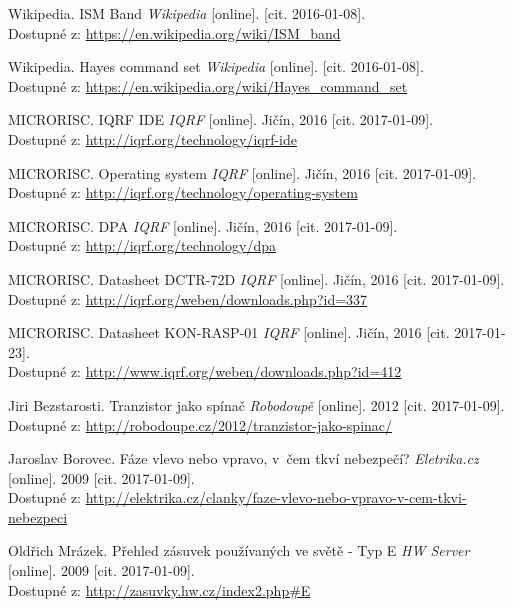 \documentclass[12pt,a4paper,oneside]{article}
\begin{document}
\begin{thebibliography}{99}


Wikipedia. ISM Band \emph{Wikipedia} [online]. [cit. 2016-01-08]. \\ Dostupné z: \url{https://en.wikipedia.org/wiki/ISM\_band}

Wikipedia. Hayes command set \emph{Wikipedia} [online]. [cit. 2016-01-08]. \\ Dostupné z: \url{https://en.wikipedia.org/wiki/Hayes\_command\_set}

MICRORISC. IQRF IDE \emph{IQRF} [online]. Jičín, 2016 [cit. 2017-01-09]. \\ Dostupné z: \url{http://iqrf.org/technology/iqrf-ide}

MICRORISC. Operating system \emph{IQRF} [online]. Jičín, 2016 [cit. 2017-01-09]. \\ Dostupné z: \url{http://iqrf.org/technology/operating-system}

MICRORISC. DPA \emph{IQRF} [online]. Jičín, 2016 [cit. 2017-01-09]. \\ Dostupné z: \url{http://iqrf.org/technology/dpa}

MICRORISC. Datasheet DCTR-72D \emph{IQRF} [online]. Jičín, 2016 [cit. 2017-01-09]. \\ Dostupné z: \url{http://iqrf.org/weben/downloads.php?id=337}

MICRORISC. Datasheet KON-RASP-01 \emph{IQRF} [online]. Jičín, 2016 [cit. 2017-01-23]. \\ Dostupné z: \url{http://www.iqrf.org/weben/downloads.php?id=412}

Jiri Bezstarosti. Tranzistor jako spínač \emph{Robodoupě} [online]. 2012 [cit. 2017-01-09]. \\ Dostupné z: \url{http://robodoupe.cz/2012/tranzistor-jako-spinac/}

Jaroslav Borovec. Fáze vlevo nebo vpravo, v~čem tkví nebezpečí? \emph{Eletrika.cz} [online]. 2009 [cit. 2017-01-09]. \\ Dostupné z: \url{http://elektrika.cz/clanky/faze-vlevo-nebo-vpravo-v-cem-tkvi-nebezpeci}

Oldřich Mrázek. Přehled zásuvek používaných ve světě - Typ E \emph{HW Server} [online]. 2009 [cit. 2017-01-09]. \\ Dostupné z: \url{http://zasuvky.hw.cz/index2.php#E}


\end{thebibliography}
\end{document}
